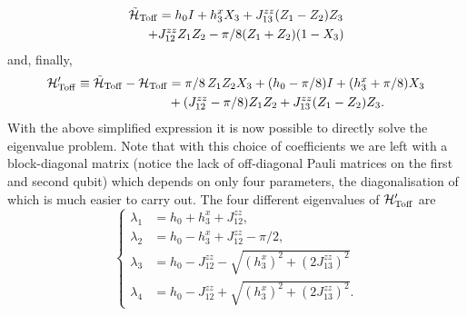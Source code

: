 \begin{equation}
\begin{aligned}
    \tilde{{\mathcal{H}}}_{\operatorname{Toff}} &= h_0 I + h_3^x X_3 + J_{13}^{zz}(Z_1 - Z_2)Z_3 \\
   +& J_{12}^{zz} Z_1 Z_2 - \pi/8 ( Z_1 +  Z_2)(1 - X_3)
\end{aligned}
\end{equation}
and, finally,
\begin{equation}
\begin{aligned}
	{\mathcal{H}}'_{\operatorname{Toff}}{}\equiv \tilde{{\mathcal{H}}}_{\operatorname{Toff}}-{\mathcal{H}}_{\operatorname{Toff}} &=
		\pi/8\, Z_1 Z_2 X_3 + (h_0 - \pi/8)I
		+ (h_3^x + \pi/8) X_3 \\
		&+ (J_{12}^{zz} - \pi/8) Z_1 Z_2 +
		J_{13}^{zz} (Z_1 - Z_2)Z_3.
\end{aligned}
\label{eq:toffoli_HPrime_reduced}
\end{equation}
With the above simplified expression it is now possible to directly solve the eigenvalue problem. Note that with this choice of coefficients we are left with a block-diagonal matrix (notice the lack of off-diagonal Pauli matrices on the first and second qubit) which depends on only four parameters, the diagonalisation of which is much easier to carry out.
The four different eigenvalues of ${\mathcal{H}}'_{\operatorname{Toff}}{}$ are
\begin{equation}
\begin{cases}
    \lambda_1 &= h_0 + h_3^x + J_{12}^{zz}, \\
    \lambda_2 &= h_0 - h_3^x + J_{12}^{zz} - \pi/2, \\
    \lambda_3 &= h_0 - J_{12}^{zz}
                - \sqrt{(h_3^x)^2+ (2J_{13}^{zz})^2}\\
    \lambda_4 &= h_0 - J_{12}^{zz}
                + \sqrt{(h_3^x)^2+ (2J_{13}^{zz})^2}.
\end{cases}
\end{equation}
